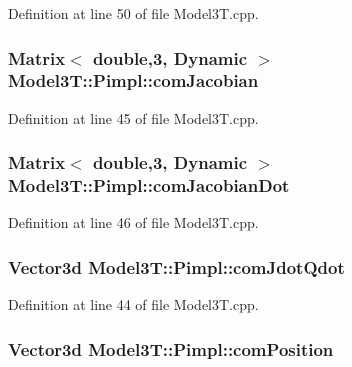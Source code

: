Definition at line 50 of file Model3\+T.\+cpp.

\subsubsection[{\texorpdfstring{com\+Jacobian}{comJacobian}}]{\setlength{\rightskip}{0pt plus 5cm}Matrix$<$ double,3, Dynamic $>$ Model3\+T\+::\+Pimpl\+::com\+Jacobian}\hypertarget{structModel3T_1_1Pimpl_ab93624d4ec1d08338eb24528b8a3ca68}{}\label{structModel3T_1_1Pimpl_ab93624d4ec1d08338eb24528b8a3ca68}


Definition at line 45 of file Model3\+T.\+cpp.

\subsubsection[{\texorpdfstring{com\+Jacobian\+Dot}{comJacobianDot}}]{\setlength{\rightskip}{0pt plus 5cm}Matrix$<$ double,3, Dynamic $>$ Model3\+T\+::\+Pimpl\+::com\+Jacobian\+Dot}\hypertarget{structModel3T_1_1Pimpl_ad1f6cba54dc65db31d3a4e54ba00acdf}{}\label{structModel3T_1_1Pimpl_ad1f6cba54dc65db31d3a4e54ba00acdf}


Definition at line 46 of file Model3\+T.\+cpp.

\subsubsection[{\texorpdfstring{com\+Jdot\+Qdot}{comJdotQdot}}]{\setlength{\rightskip}{0pt plus 5cm}Vector3d Model3\+T\+::\+Pimpl\+::com\+Jdot\+Qdot}\hypertarget{structModel3T_1_1Pimpl_a997711d057aa854ab997992497fe276b}{}\label{structModel3T_1_1Pimpl_a997711d057aa854ab997992497fe276b}


Definition at line 44 of file Model3\+T.\+cpp.

\subsubsection[{\texorpdfstring{com\+Position}{comPosition}}]{\setlength{\rightskip}{0pt plus 5cm}Vector3d Model3\+T\+::\+Pimpl\+::com\+Position}\hypertarget{structModel3T_1_1Pimpl_a61412bd640cbf9f3bffa791261123328}{}\label{structModel3T_1_1Pimpl_a61412bd640cbf9f3bffa791261123328}


